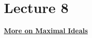 \documentclass[../Main.tex]{subfiles}
\begin{document}
\chapter{Lecture 8}
\underline{\textbf{\Large More on Maximal Ideals}}~\\
\end{document}
